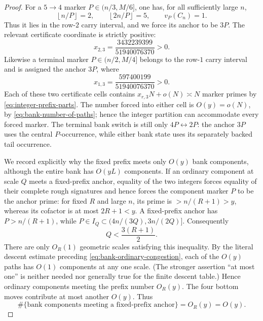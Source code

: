 \documentclass[11pt]{article}
\numberwithin{equation}{section}
\theoremstyle{definition}
\theoremstyle{remark}
\newcommand{\1}{\mathbf 1}
\begin{document}
\begin{proof}
For a \(5\to4\) marker \(P\in(n/3,M/6]\), one has, for all sufficiently
large \(n\),
\[
 \left\lfloor n/P\right\rfloor=2,\qquad
 \left\lfloor2n/P\right\rfloor=5,\qquad v_P(C_n)=1.
\]
Thus it lies in the row-\(2\) carry interval, and we force its anchor to
be \(3P\).  The relevant certificate coordinate is strictly positive:
\begin{equation}
                  x_{2,3}=\frac{3432239399}{51940076370}>0.
 \label{eq:bank-positive-row-two-cell}
\end{equation}
Likewise a terminal marker \(P\in(n/2,M/4]\) belongs to the row-\(1\)
carry interval and is assigned the anchor \(3P\), where
\begin{equation}
                  x_{1,3}=\frac{597400199}{51940076370}>0.
 \label{eq:bank-positive-row-one-cell}
\end{equation}
Each of these two certificate cells contains
\(x_{r,3}N+o(N)\asymp N\) marker primes by
\eqref{eq:integer-prefix-parts}.  The number forced into either cell is
\(O(y)=o(N)\), by \eqref{eq:bank-number-of-paths}; hence the integer
partition can accommodate every forced marker.  The terminal bank switch
is still only \(4P\leftrightarrow2P\): the anchor \(3P\) uses the central
\(P\)-occurrence, while either bank state uses its separately backed tail
occurrence.

We record explicitly why the fixed prefix meets only \(O(y)\) bank
components, although the entire bank has \(O(yL)\) components.  If an
ordinary component at scale \(Q\) meets a fixed-prefix anchor, equality of
the two integers forces equality of their complete rough signatures and
hence forces the component marker \(P\) to be the anchor prime: for fixed
\(R\) and large \(n\), its prime is \(>n/(R+1)>y\), whereas its cofactor
is at most \(2R+1<y\).  A fixed-prefix anchor has
\(P>n/(R+1)\), while
\(P\in I_Q\subset(4n/(3Q),3n/(2Q)]\).  Consequently
\[
                         Q<\frac{3(R+1)}2.
\]
There are only \(O_R(1)\) geometric scales satisfying this inequality.
By the literal descent estimate preceding
\eqref{eq:bank-ordinary-congestion}, each of the \(O(y)\) paths has
\(O(1)\) components at any one scale.  (The stronger assertion ``at most
one'' is neither needed nor generally true for the finite descent table.)
Hence ordinary components meeting the prefix number \(O_R(y)\).  The
four bottom moves contribute at most another \(O(y)\).  Thus
\begin{equation}
 \#\{\text{bank components meeting a fixed-prefix anchor}\}
                         =O_R(y)=O(y).
 \label{eq:bank-prefix-component-count}
\end{equation}


\end{proof}
\end{document}
